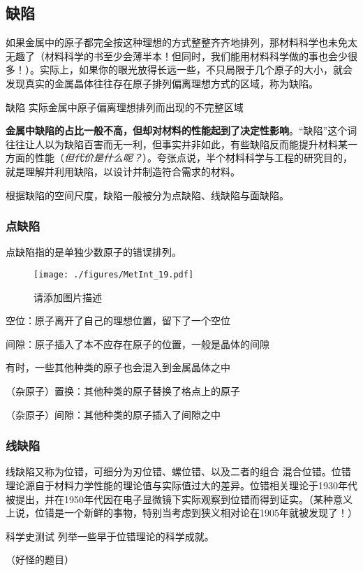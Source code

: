 \subsection{缺陷}
如果金属中的原子都完全按这种理想的方式整整齐齐地排列，那材料科学也未免太无趣了（材料科学的书至少会薄半本！但同时，我们能用材料科学做的事也会少很多！）。实际上，如果你的眼光放得长远一些，不只局限于几个原子的大小，就会发现真实的金属晶体往往存在原子排列偏离理想方式的区域，称为缺陷。

\begin{definition}{缺陷}
实际金属中原子偏离理想排列而出现的不完整区域
\end{definition}

\textbf{金属中缺陷的占比一般不高，但却对材料的性能起到了决定性影响}。“缺陷”这个词往往让人以为缺陷百害而无一利，但事实并非如此，有些缺陷反而能提升材料某一方面的性能（\textsl{但代价是什么呢？}）。夸张点说，半个材料科学与工程的研究目的，就是理解并利用缺陷，以设计并制造符合需求的材料。

根据缺陷的空间尺度，缺陷一般被分为点缺陷、线缺陷与面缺陷。

\subsubsection{点缺陷}
点缺陷指的是单独少数原子的错误排列。
\begin{figure}[ht]
\centering
\texttt{[image: ./figures/MetInt\_19.pdf]}
\caption{请添加图片描述} \label{MetInt_fig19}
\end{figure}
空位：原子离开了自己的理想位置，留下了一个空位

间隙：原子插入了本不应存在原子的位置，一般是晶体的间隙

有时，一些其他种类的原子也会混入到金属晶体之中


（杂原子）置换：其他种类的原子替换了格点上的原子

（杂原子）间隙：其他种类的原子插入了间隙之中

\subsubsection{线缺陷}
线缺陷又称为位错，可细分为刃位错、螺位错、以及二者的组合 混合位错。位错理论源自于材料力学性能的理论值与实际值过大的差异。位错相关理论于1930年代被提出，并在1950年代因在电子显微镜下实际观察到位错而得到证实。（某种意义上说，位错是一个新鲜的事物，特别当考虑到狭义相对论在1905年就被发现了！）

\begin{exercise}{科学史测试}
列举一些早于位错理论的科学成就。

（好怪的题目）
\end{exercise}

